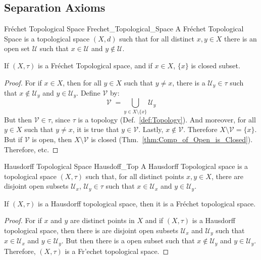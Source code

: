     \subsection{Separation Axioms}
    \begin{ldefinition}{Fr\'{e}chet Topological Space}
                       {Frechet_Topological_Space}
        A Fr\'{e}chet Topological Space is a topological space $(X,d)$ such that
        for all distinct $x,y\in{X}$ there is an open set $\mathcal{U}$ such
        that $x\in\mathcal{U}$ and $y\notin\mathcal{U}$.
    \end{ldefinition}
    \begin{theorem}
        If $(X,\tau)$ is a Fr\'{e}chet Topological space, and if $x\in{X}$,
        $\{x\}$ is closed subset.
    \end{theorem}
    \begin{proof}
        For if $x\in{X}$, then for all $y\in{X}$ such that $y\ne{x}$, there is
        a $\mathcal{U}_{y}\in\tau$ such that $x\notin\mathcal{U}_{y}$ and
        $y\in\mathcal{U}_{y}$. Define $\mathcal{V}$ by:
        \begin{equation}
            \mathcal{V}\;=\bigcup_{y\in{X}\setminus\{x\}}\mathcal{U}_{y}
        \end{equation}
        But then $\mathcal{V}\in\tau$, since $\tau$ is a topology
        (Def.~\ref{def:Topology}). And moreover, for all $y\in{X}$ such that
        $y\ne{x}$, it is true that $y\in\mathcal{V}$. Lastly,
        $x\notin\mathcal{V}$. Therefore $X\setminus\mathcal{V}=\{x\}$. But if
        $\mathcal{V}$ is open, then $X\setminus\mathcal{V}$ is closed
        (Thm.~\ref{thm:Comp_of_Open_is_Closed}). Therefore, etc.
    \end{proof}
    \begin{ldefinition}{Hausdorff Topological Space}
          {Hausdoff_Top}
        A Hausdorff Topological space is a topological space
        $(X,\tau)$ such that, for all distinct points
        $x,y\in{X}$, there are disjoint open subsets
        $\mathcal{U}_{x}$, $\mathcal{U}_{y}\in\tau$ such that
        $x\in\mathcal{U}_{x}$ and $y\in\mathcal{U}_{y}$.
    \end{ldefinition}
    \begin{theorem}
        If $(X,\tau)$ is a Hausdorff topological space, then
        it is a Fr\'{e}chet topological space.
    \end{theorem}
    \begin{proof}
        For if $x$ and $y$ are distinct points in $X$ and if
        $(X,\tau)$ is a Hausdorff topological space, then there
        is are disjoint open subsets $\mathcal{U}_{x}$ and
        $\mathcal{U}_{y}$ such that $x\in\mathcal{U}_{x}$ and
        $y\in\mathcal{U}_{y}$. But then there is a open subset
        such that $x\notin\mathcal{U}_{y}$ and
        $y\in\mathcal{U}_{y}$. Therefore, $(X,\tau)$ is a
        Fr'{e}chet topological space.
    \end{proof}
